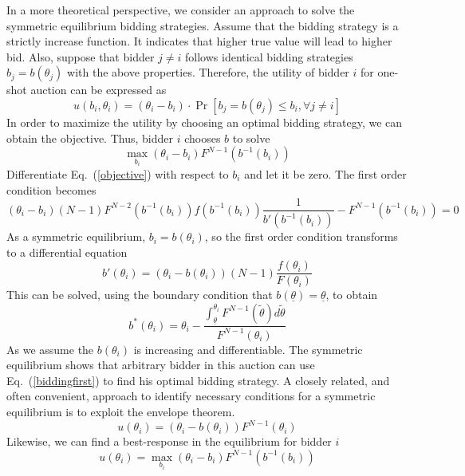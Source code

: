 In a more theoretical perspective, we consider an approach to solve the symmetric equilibrium bidding strategies. Assume that the bidding strategy is a strictly increase function. It indicates that higher true value will lead to higher bid. Also, suppose that bidder $j \neq i$ follows identical bidding strategies $b_j=b(\theta_j)$ with the above properties. Therefore, the utility of bidder $i$ for one-shot auction can be expressed as 
\begin{equation}
u(b_i,\theta_i)=(\theta_i-b_i) \cdot \Pr [b_j=b(\theta_j)\leq b_i, \forall j \neq i]
\end{equation}
In order to maximize the utility by choosing an optimal bidding strategy, we can obtain the objective. Thus, bidder $i$ chooses $b$ to solve
\begin{equation}
\label{objective}
\underset{b_i} \max (\theta_i-b_i)F^{N-1}(b^{-1}(b_i))
\end{equation}
Differentiate Eq.~(\ref{objective}) with respect to $b_i$ and let it be zero. The first order condition becomes
\begin{equation}
(\theta_i-b_i)(N-1)F^{N-2}(b^{-1}(b_i))f(b^{-1}(b_i))\frac{1}{b'(b^{-1}(b_i))}-F^{N-1}(b^{-1}(b_i))=0
\end{equation}
As a symmetric equilibrium, $b_i=b(\theta_i)$, so the first order condition transforms to a differential equation 
\begin{equation}
b'(\theta_i)=(\theta_i-b(\theta_i))(N-1)\frac{f(\theta_i)}{F(\theta_i)}
\end{equation}
This can be solved, using the boundary condition that $b(\underline{\theta})=\underline{\theta}$, to obtain
\begin{equation}
\label{biddingfirst}
b^{*}(\theta_i)=\theta_i-\frac{\int_{\underline{\theta}}^{\theta_i}F^{N-1}(\widetilde{\theta})d\widetilde{\theta}}{F^{N-1}(\theta_i)}
\end{equation}
As we assume the $b(\theta_i)$ is increasing and differentiable. The symmetric equilibrium shows that arbitrary bidder in this auction can use Eq.~(\ref{biddingfirst}) to find his optimal bidding strategy. A closely related, and often convenient, approach to identify necessary conditions for a symmetric equilibrium is to exploit the envelope theorem.
\begin{equation}
\label{envelope}
u(\theta_i)=(\theta_i-b(\theta_i))F^{N-1}(\theta_i)
\end{equation}
Likewise, we can find a best-response in the equilibrium for bidder $i$
\begin{equation}
u(\theta_i)=\underset{b_i} \max (\theta_i-b_i)F^{N-1}(b^{-1}(b_i))
\end{equation}
